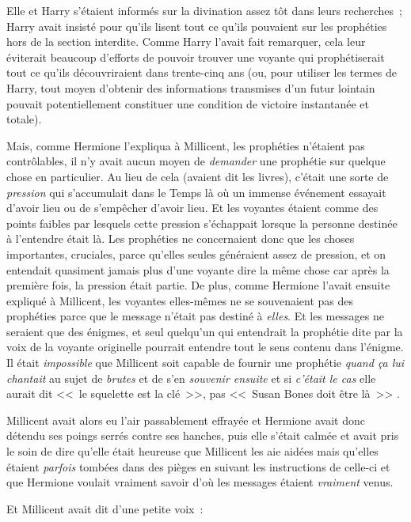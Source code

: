 Elle et Harry s'étaient informés sur la divination assez tôt dans leurs recherches~; Harry avait insisté pour qu'ils lisent tout ce qu'ils pouvaient sur les prophéties hors de la section interdite. Comme Harry l'avait fait remarquer, cela leur éviterait beaucoup d'efforts de pouvoir trouver une voyante qui prophétiserait tout ce qu'ils découvriraient dans trente-cinq ans (ou, pour utiliser les termes de Harry, tout moyen d'obtenir des informations transmises d'un futur lointain pouvait potentiellement constituer une condition de victoire instantanée et totale).

Mais, comme Hermione l'expliqua à Millicent, les prophéties n'étaient pas contrôlables, il n'y avait aucun moyen de \emph{demander} une prophétie sur quelque chose en particulier. Au lieu de cela (avaient dit les livres), c'était une sorte de \emph{pression} qui s'accumulait dans le Temps là où un immense événement essayait d'avoir lieu ou de s'empêcher d'avoir lieu. Et les voyantes étaient comme des points faibles par lesquels cette pression s'échappait lorsque la personne destinée à l'entendre était là. Les prophéties ne concernaient donc que les choses importantes, cruciales, parce qu'elles seules généraient assez de pression, et on entendait quasiment jamais plus d'une voyante dire la même chose car après la première fois, la pression était partie. De plus, comme Hermione l'avait ensuite expliqué à Millicent, les voyantes elles-mêmes ne se souvenaient pas des prophéties parce que le message n'était pas destiné à \emph{elles}. Et les messages ne seraient que des énigmes, et seul quelqu'un qui entendrait la prophétie dite par la voix de la voyante originelle pourrait entendre tout le sens contenu dans l'énigme. Il était \emph{impossible} que Millicent soit capable de fournir une prophétie \emph{quand ça lui chantait} au sujet de \emph{brutes} et de s'en \emph{souvenir ensuite} et si \emph{c'était le cas} elle aurait dit <<~le squelette est la clé~>>, pas <<~Susan Bones\footnotemark{} doit être là~>>
.

Millicent avait alors eu l'air passablement effrayée et Hermione avait donc détendu ses poings serrés contre ses hanches, puis elle s'était calmée et avait pris le soin de dire qu'elle était heureuse que Millicent les aie aidées mais qu'elles étaient \emph{parfois} tombées dans des pièges en suivant les instructions de celle-ci et que Hermione voulait vraiment savoir d'où les messages étaient \emph{vraiment} venus.

Et Millicent avait dit d'une petite voix~:

